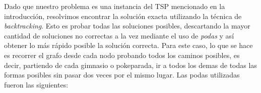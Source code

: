         Dado que nuestro problema es una instancia del TSP mencionado en la introducción, resolvimos encontrar la solución exacta utilizando la técnica de \textit{backtracking}. Esto es probar todas las soluciones posibles, descartando la mayor cantidad de soluciones no correctas a la vez mediante el uso de \textit{podas} y así obtener lo más rápido posible la solución correcta. Para este caso, lo que se hace es recorrer el grafo desde cada nodo probando todos los caminos posibles, es decir, partiendo de cada gimnasio o pokeparada, ir a todos los demas de todas las formas posibles sin pasar dos veces por el mismo lugar. Las podas utilizadas fueron las siguientes:
